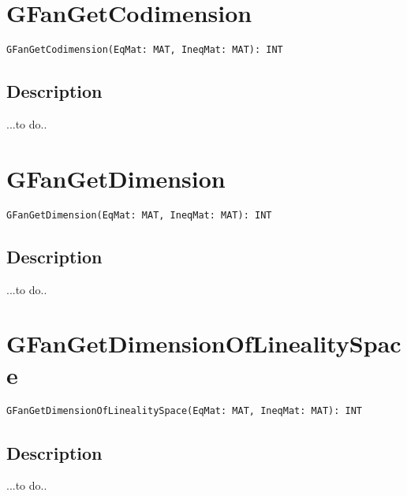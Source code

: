 \documentclass[a4paper]{mybook}
\newenvironment{command}{}{} %
\begin{document}
\section{GFanGetCodimension}
\label{GFanGetCodimension}
\begin{command} %


\begin{Verbatim}[label=syntax, rulecolor=\color{MidnightBlue},
frame=single]
GFanGetCodimension(EqMat: MAT, IneqMat: MAT): INT
\end{Verbatim}


\subsection*{Description}

...to do..

\end{command} %

\section{GFanGetDimension}
\label{GFanGetDimension}
\begin{command} %


\begin{Verbatim}[label=syntax, rulecolor=\color{MidnightBlue},
frame=single]
GFanGetDimension(EqMat: MAT, IneqMat: MAT): INT
\end{Verbatim}


\subsection*{Description}

...to do..

\end{command} %

\section{GFanGetDimensionOfLinealitySpace}
\label{GFanGetDimensionOfLinealitySpace}
\begin{command} %


\begin{Verbatim}[label=syntax, rulecolor=\color{MidnightBlue},
frame=single]
GFanGetDimensionOfLinealitySpace(EqMat: MAT, IneqMat: MAT): INT
\end{Verbatim}


\subsection*{Description}

...to do..

\end{command} %
\end{document}
